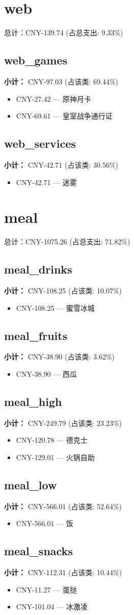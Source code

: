 \documentclass[12pt]{article}
\begin{document}
\section*{web}
总计：CNY-139.74 	 (占总支出: 9.33\%)

\subsection*{web\_games}
\textbf{小计：} CNY-97.03 (占该类: 69.44\%)
\begin{itemize}
    \item CNY-27.42 --- 原神月卡
    \item CNY-69.61 --- 皇室战争通行证
\end{itemize}
\subsection*{web\_services}
\textbf{小计：} CNY-42.71 (占该类: 30.56\%)
\begin{itemize}
    \item CNY-42.71 --- 迷雾
\end{itemize}
\section*{meal}
总计：CNY-1075.26 	 (占总支出: 71.82\%)

\subsection*{meal\_drinks}
\textbf{小计：} CNY-108.25 (占该类: 10.07\%)
\begin{itemize}
    \item CNY-108.25 --- 蜜雪冰城
\end{itemize}
\subsection*{meal\_fruits}
\textbf{小计：} CNY-38.90 (占该类: 3.62\%)
\begin{itemize}
    \item CNY-38.90 --- 西瓜
\end{itemize}
\subsection*{meal\_high}
\textbf{小计：} CNY-249.79 (占该类: 23.23\%)
\begin{itemize}
    \item CNY-120.78 --- 德克士
    \item CNY-129.01 --- 火锅自助
\end{itemize}
\subsection*{meal\_low}
\textbf{小计：} CNY-566.01 (占该类: 52.64\%)
\begin{itemize}
    \item CNY-566.01 --- 饭
\end{itemize}
\subsection*{meal\_snacks}
\textbf{小计：} CNY-112.31 (占该类: 10.44\%)
\begin{itemize}
    \item CNY-11.27 --- 蛋挞
    \item CNY-101.04 --- 冰激凌
\end{itemize}
\end{document}
